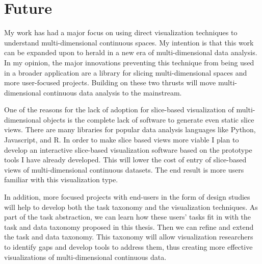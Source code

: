 
\section{Future}

My work has had a major focus on using direct visualization techniques to
understand multi-dimensional continuous spaces. My intention is that this work
can be expanded upon to herald in a new era of multi-dimensional data analysis.
In my opinion, the major innovations preventing this technique from being used
in a broader application are a library for slicing multi-dimensional spaces and
more user-focused projects.  Building on these two thrusts will move
multi-dimensional continuous data analysis to the mainstream.

One of the reasons for the lack of adoption for slice-based visualization of
multi-dimensional objects is the complete lack of software to generate even
static slice views. There are many libraries for popular data analysis
languages like Python, Javascript, and R. In order to make slice based views
more viable I plan to develop an interactive slice-based visualization software
based on the prototype tools I have already developed. This will lower the cost
of entry of slice-based views of multi-dimensional continuous datasets. The end
result is more users familiar with this visualization type.

In addition, more focused projects with end-users in the form of design
studies~\cite{Sedlmair:2012} will help to develop both the task taxonomy and
the visualization techniques. As part of the task abstraction, we can learn how
these users' tasks fit in with the task and data taxonomy proposed in this
thesis. Then we can refine and extend the task and data taxonomy. This taxonomy
will allow visualization researchers to identify gaps and develop tools to
address them, thus creating more effective visualizations of multi-dimensional
continuous data.

